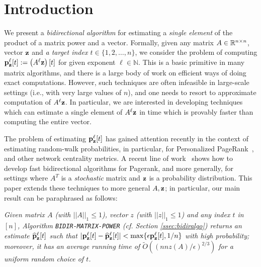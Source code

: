 \section{Introduction}
\label{sec:intro}

We present a \emph{bidirectional algorithm} for estimating a \emph{single element} of the product of a matrix power and a vector.
Formally, given any matrix $A\in\mathbb{R}^{n\times n}$, vector $\mathbf{z}$ and \emph{a target index $t\in\{1,2,\ldots,n\}$}, we consider the problem of computing ${\mathbf{p}}_\mathbf{z}^{\ell}[t] := \left(A^{\ell}\mathbf{z}\right)[t]$ for given exponent $\ell\in\mathbb{N}$.
This is a basic primitive in many matrix algorithms, and there is a large body of work on efficient ways of doing exact computations. 
However, such techniques are often infeasible in large-scale settings (i.e., with very large values of $n$), and one needs to resort to approximate computation of $A^{\ell}\mathbf{z}$.
In particular, we are interested in developing techniques which can estimate a single element of $A^{\ell}\mathbf{z}$ in time which is provably faster than computing the entire vector. 

The problem of estimating ${\mathbf{p}}_\mathbf{z}^{\ell}[t]$ has gained attention recently in the context of estimating random-walk probabilities, in particular, for Personalized PageRank~\cite{Page1999}, and other network centrality metrics. 
A recent line of work~\cite{Lofgren2014,lofgren2016personalized,banerjee2015fast} shows how to develop fast bidirectional algorithms for Pagerank, and more generally, for settings where $A^T$ is a \emph{stochastic} matrix and $\mathbf{z}$ is a probability distribution.
This paper extends these techniques to more general $A,\mathbf{z}$; in particular, our main result can be paraphrased as follows:
\begin{proposition}
\emph{Given matrix $A$ (with $||A||_1\leq 1$), vector $z$ (with $||z||_1\leq 1$) and any index $t$ in $[n]$, Algorithm \texttt{BIDIR-MATRIX-POWER} (cf. Section \ref{ssec:bidiralgo}) returns an estimate $\widehat{\mathbf{p}}_\mathbf{z}^{\ell}[t]$ such that $|{\mathbf{p}}_\mathbf{z}^{\ell}[t]-\widehat{\mathbf{p}}_\mathbf{z}^{\ell}[t]|<\max\{\epsilon{\mathbf{p}}_\mathbf{z}^{\ell}[t],1/n\}$ with high probability; moreover, it has an average running time of $\widetilde{O}\left(\left(nnz(A)/\epsilon\right)^{2/3}\right)$ for a uniform random choice of $t$.}
\end{proposition}	

